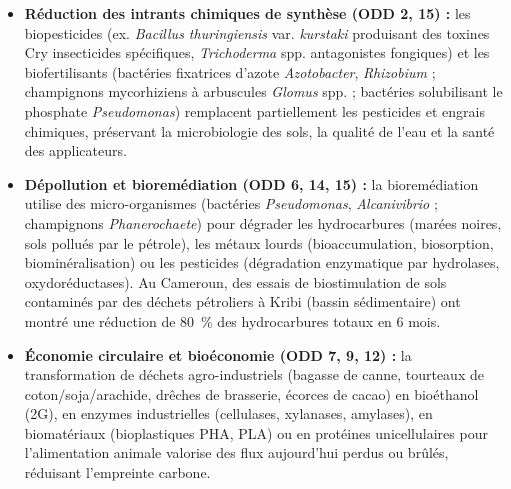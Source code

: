 \documentclass[11pt]{article}
\newcommand{\cle}[1]{{\popxbold\color{popdark}#1}}
\begin{document}
\begin{itemize}
    \item \textbf{Réduction des intrants chimiques de synthèse (ODD 2, 15) :} les \cle{biopesticides} (ex. \emph{Bacillus thuringiensis} var. \emph{kurstaki} produisant des toxines Cry insecticides spécifiques, \emph{Trichoderma} spp. antagonistes fongiques) et les \cle{biofertilisants} (bactéries fixatrices d'azote \emph{Azotobacter}, \emph{Rhizobium} ; champignons mycorhiziens à arbuscules \emph{Glomus} spp. ; bactéries solubilisant le phosphate \emph{Pseudomonas}) remplacent partiellement les pesticides et engrais chimiques, préservant la microbiologie des sols, la qualité de l'eau et la santé des applicateurs.
    \item \textbf{Dépollution et bioremédiation (ODD 6, 14, 15) :} la \cle{bioremédiation} utilise des micro-organismes (bactéries \emph{Pseudomonas}, \emph{Alcanivibrio} ; champignons \emph{Phanerochaete}) pour dégrader les hydrocarbures (marées noires, sols pollués par le pétrole), les métaux lourds (bioaccumulation, biosorption, biominéralisation) ou les pesticides (dégradation enzymatique par hydrolases, oxydoréductases). Au Cameroun, des essais de biostimulation de sols contaminés par des déchets pétroliers à Kribi (bassin sédimentaire) ont montré une réduction de \SI{80}{\percent} des hydrocarbures totaux en 6 mois.
    \item \textbf{Économie circulaire et bioéconomie (ODD 7, 9, 12) :} la transformation de déchets agro-industriels (bagasse de canne, tourteaux de coton/soja/arachide, drêches de brasserie, écorces de cacao) en bioéthanol (2G), en enzymes industrielles (cellulases, xylanases, amylases), en biomatériaux (bioplastiques PHA, PLA) ou en protéines unicellulaires pour l'alimentation animale valorise des flux aujourd'hui perdus ou brûlés, réduisant l'empreinte carbone.
\end{itemize}
\end{document}
